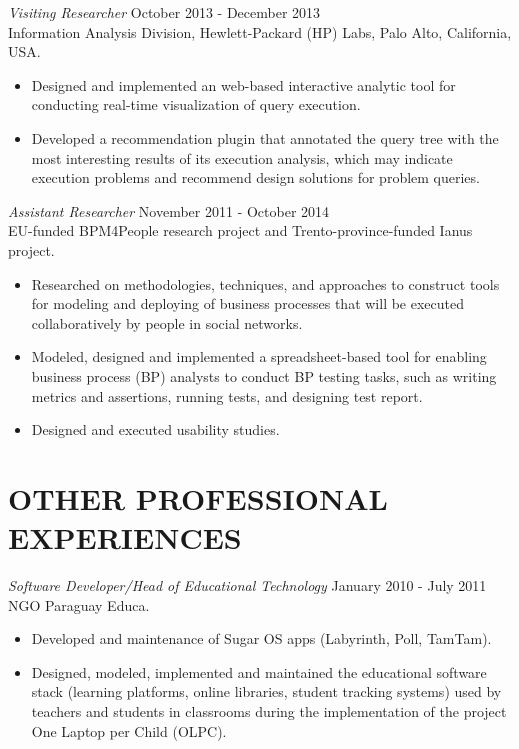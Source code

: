 \documentclass[line,margin]{res}
\begin{document}
\begin{resume}
{\sl Visiting Researcher} \hfill October 2013 - December 2013 \\
Information Analysis Division, Hewlett-Packard (HP) Labs, Palo Alto, California, USA.
\begin{itemize}  \itemsep -2pt %
\item Designed and implemented an web-based interactive analytic tool for conducting real-time visualization of query execution.
\item Developed a recommendation plugin that annotated the query tree with the most interesting results of its execution analysis, which may indicate execution problems and recommend design solutions for problem queries.
\end{itemize}

{\sl Assistant Researcher} \hfill November 2011 - October 2014 \\
EU-funded BPM4People research project and Trento-province-funded Ianus project.
\begin{itemize}  \itemsep -2pt %
\item Researched on methodologies, techniques, and approaches to construct tools for modeling and deploying of business processes that will be executed collaboratively by people in social networks.
\item Modeled, designed and implemented a spreadsheet-based tool for enabling business process (BP) analysts to conduct BP testing tasks, such as writing metrics and assertions, running tests, and designing test report.
\item Designed and executed usability studies.
\end{itemize}


\section{OTHER PROFESSIONAL EXPERIENCES} 
{\sl Software Developer/Head of Educational Technology} \hfill January 2010 - July 2011 \\
NGO Paraguay Educa. 
\begin{itemize}  \itemsep -2pt %
\item Developed and maintenance of Sugar OS apps (Labyrinth, Poll, TamTam).
\item Designed, modeled, implemented and maintained the educational software stack (learning platforms, online libraries, student tracking systems) used by teachers and students in classrooms during the implementation of the project One Laptop per Child (OLPC).
\end{itemize}
 

\end{resume}
\end{document}
